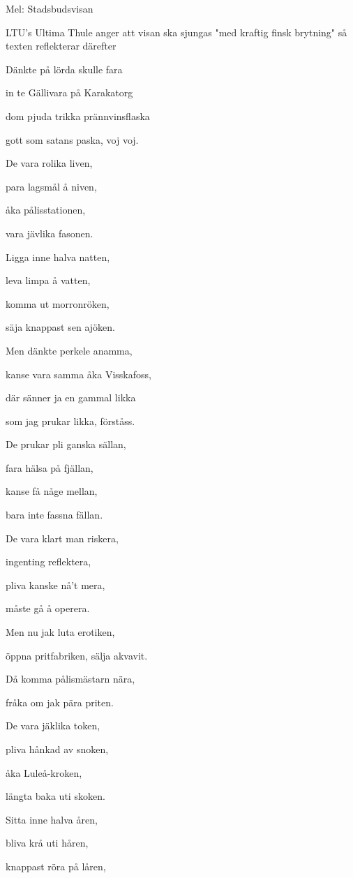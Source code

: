 Mel:  Stadsbudsvisan

LTU's Ultima Thule anger att visan ska sjungas "med kraftig finsk brytning" så texten reflekterar därefter\bigskip



Dänkte på lörda skulle fara

in te Gällivara på Karakatorg

dom pjuda trikka prännvinsflaska

gott som satans paska, voj voj.

De vara rolika liven,

para lagsmål å niven,

åka pålisstationen,

vara jävlika fasonen.

Ligga inne halva natten,

leva limpa å vatten,

komma ut morronröken,

säja knappast sen ajöken.\bigskip

Men dänkte perkele anamma,

kanse vara samma åka Visskafoss,

där sänner ja en gammal likka

som jag prukar likka, förståss.

De prukar pli ganska sällan,

fara hälsa på fjällan,

kanse få någe mellan,

bara inte fassna fällan.

De vara klart man riskera,

ingenting reflektera,

pliva kanske nå’t mera,

måste gå å operera.\bigskip

Men nu jak luta erotiken,

öppna pritfabriken, sälja akvavit.

Då komma pålismästarn nära,

fråka om jak pära priten.

De vara jäklika token,

pliva hånkad av snoken,

åka Luleå-kroken,

längta baka uti skoken.

Sitta inne halva åren,

bliva krå uti håren,

knappast röra på låren,

